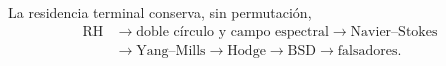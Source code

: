 La residencia terminal conserva, sin permutación,
\[
\begin{aligned}
 \mathrm{RH}
 &\longrightarrow \text{doble círculo y campo espectral}
 \longrightarrow \mathrm{Navier\text{--}Stokes}\\
 &\longrightarrow \mathrm{Yang\text{--}Mills}
 \longrightarrow \mathrm{Hodge}
 \longrightarrow \mathrm{BSD}
 \longrightarrow \text{falsadores}.
\end{aligned}
\]
